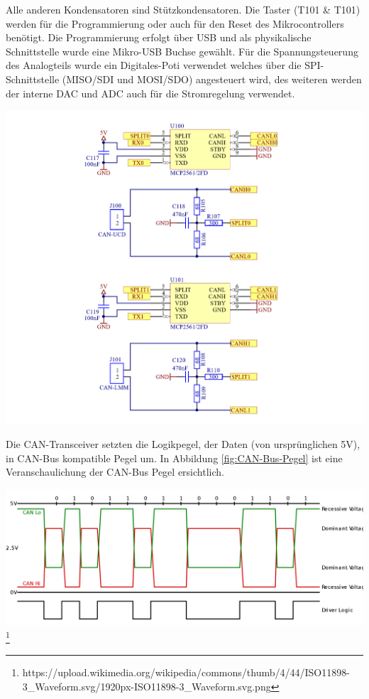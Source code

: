 \documentclass[paper=a4, 12pt]{scrreprt}
\begin{document}
	Alle anderen Kondensatoren sind Stützkondensatoren. Die Taster (T101 \& T101) werden für die Programmierung oder auch für den Reset des Mikrocontrollers benötigt. Die Programmierung erfolgt über USB und als physikalische Schnittstelle wurde eine Mikro-USB Buchse gewählt. Für die Spannungsteuerung des Analogteils wurde ein Digitales-Poti verwendet welches über die SPI-Schnittstelle (MISO/SDI und MOSI/SDO) angesteuert wird, des weiteren werden der interne DAC und ADC auch für die Stromregelung verwendet.
		\begin{adjustbox}{center,caption={CAN-Transceiver},label={fig:CAN-Transceiver},nofloat=figure,vspace=\bigskipamount}
		\includegraphics[width=\textwidth]{img/CAN_Tranceiver.PNG}
		\end{adjustbox}
	Die CAN-Transceiver setzten die Logikpegel, der Daten (von ursprünglichen 5V), in CAN-Bus kompatible Pegel um. In Abbildung \ref{fig:CAN-Bus-Pegel} ist eine Veranschaulichung der CAN-Bus Pegel ersichtlich.
	
	\begin{adjustbox}{center,caption={CAN-Bus Pegelumsetzung},label={fig:CAN-Bus-Pegel},nofloat=figure,vspace=\bigskipamount}
		\includegraphics[width=\textwidth]{img/CAN-Pegelumsetzung.PNG}\footnote{https://upload.wikimedia.org/wikipedia/commons/thumb/4/44/ISO11898-3\_Waveform.svg/1920px-ISO11898-3\_Waveform.svg.png}
	\end{adjustbox}
	\hfill \break
\end{document}
